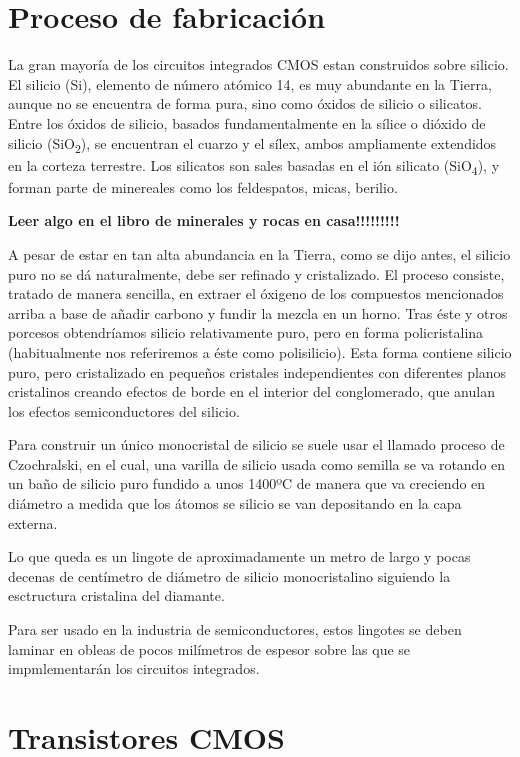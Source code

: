 \documentclass[12pt,a4paper,oneside,titlepage]{report}
\begin{document}
\section{Proceso de fabricación}

La gran mayoría de los circuitos integrados CMOS estan construidos sobre silicio.
El silicio (Si), elemento de número atómico 14, es muy abundante en la Tierra, aunque
no se encuentra de forma pura, sino como óxidos de silicio o silicatos. Entre los
óxidos de silicio, basados fundamentalmente en la sílice o dióxido de silicio
(SiO\textsubscript{2}), se encuentran el cuarzo y el sílex, ambos ampliamente extendidos
en la corteza terrestre. Los silicatos son sales basadas en el ión silicato (SiO\textsubscript{4}),
y forman parte de minereales como los feldespatos, micas, berilio.

\huge{\textbf{Leer algo en el libro de minerales y rocas en casa!!!!!!!!!}}

A pesar de estar en tan alta abundancia en la Tierra, como se dijo antes, el silicio
puro no se dá naturalmente, debe ser refinado y cristalizado. El proceso consiste,
tratado de manera sencilla, en extraer el óxigeno de los compuestos mencionados arriba
a base de añadir carbono y fundir la mezcla en un horno. Tras éste y otros porcesos
obtendríamos silicio relativamente puro, pero en forma policristalina (habitualmente
nos referiremos a éste como polisilicio). Esta forma contiene silicio puro, pero
cristalizado en pequeños cristales independientes con diferentes planos cristalinos
creando efectos de borde en el interior del conglomerado, que anulan los efectos
semiconductores del silicio.

Para construir un único monocristal de silicio se suele usar el llamado proceso
de Czochralski, en el cual, una varilla de silicio usada como semilla se va
rotando en un baño de silicio puro fundido a unos 1400ºC de manera que va creciendo
en diámetro a medida que los átomos se silicio se van depositando en la capa externa.

Lo que queda es un lingote de aproximadamente un metro de largo y pocas decenas
de centímetro de diámetro de silicio monocristalino siguiendo la esctructura cristalina del
diamante.

Para ser usado en la industria de semiconductores, estos lingotes se deben laminar
en obleas de pocos milímetros de espesor sobre las que se impmlementarán los
circuitos integrados.

\section{Transistores CMOS}
\end{document}
